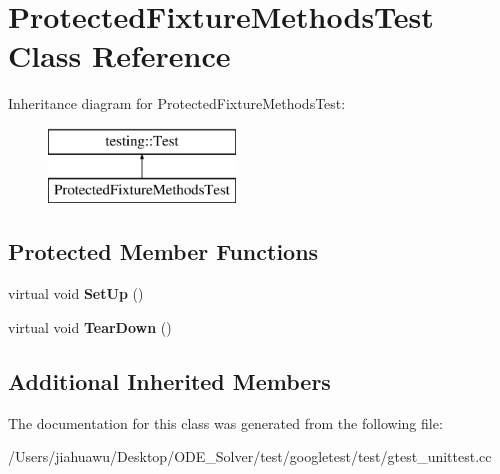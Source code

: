 \hypertarget{class_protected_fixture_methods_test}{}\section{Protected\+Fixture\+Methods\+Test Class Reference}
\label{class_protected_fixture_methods_test}
Inheritance diagram for Protected\+Fixture\+Methods\+Test\+:\begin{figure}[H]
\begin{center}
\leavevmode
\includegraphics[height=2.000000cm]{class_protected_fixture_methods_test}
\end{center}
\end{figure}
\subsection*{Protected Member Functions}
\begin{DoxyCompactItemize}
\item 
\mbox{\label{class_protected_fixture_methods_test_a5184c708ac89cfb69f0e4c742e93398a}} 
virtual void {\bfseries Set\+Up} ()
\item 
\mbox{\label{class_protected_fixture_methods_test_aa143dff0a99903cde207b6fd0042c03c}} 
virtual void {\bfseries Tear\+Down} ()
\end{DoxyCompactItemize}
\subsection*{Additional Inherited Members}


The documentation for this class was generated from the following file\+:\begin{DoxyCompactItemize}
\item 
/\+Users/jiahuawu/\+Desktop/\+O\+D\+E\+\_\+\+Solver/test/googletest/test/gtest\+\_\+unittest.\+cc\end{DoxyCompactItemize}
